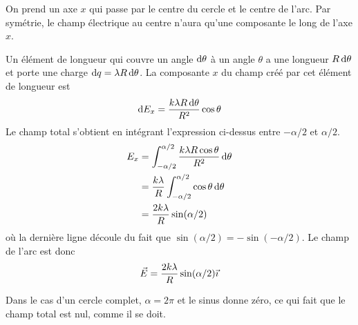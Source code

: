 \begin{center}
\end{center}

On prend un axe $x$ qui passe par le centre du cercle et le centre de l'arc.
Par symétrie, le champ électrique au centre n'aura qu'une composante le long de
l'axe $x$.

Un élément de longueur qui couvre un angle $\mathrm{d} \theta$ à un angle $\theta$ a
une longueur $R\,\mathrm{d} \theta$ et porte une charge $\mathrm{d} q = \lambda R \,\mathrm{d}
\theta$. La composante $x$ du champ créé par cet élément de longueur est
\[
  \mathrm{d} E_x =  \frac{k\lambda R \,\mathrm{d} \theta}{R^2} \cos \theta
\]
Le champ total s'obtient en intégrant l'expression ci-dessus entre
$-\alpha / 2$ et $\alpha / 2$.
\begin{align*}
  E_x &= \int_{-\alpha / 2}^{\alpha / 2}
          \frac{k\lambda R \cos \theta}{R^2} \,\mathrm{d} \theta \\
      &=  \frac{k\lambda}{R} \int_{-\alpha / 2}^{\alpha / 2}
          \cos \theta \,\mathrm{d} \theta \\
      &= \frac{2k\lambda}{R} \sin(\alpha / 2)
\end{align*}
où la dernière ligne découle du fait que $\sin(\alpha / 2) = -\sin(-\alpha
/ 2)$.  Le champ de l'arc est donc
\[
  \vec{E} = \frac{2k\lambda}{R} \sin(\alpha / 2) \vec{\imath}
\]

Dans le cas d'un cercle complet, $\alpha = 2\pi$ et le sinus donne zéro, ce qui
fait que le champ total est nul, comme il se doit.



